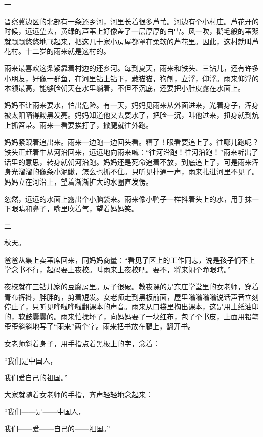 \documentclass[12pt,UTF-8,openany]{ctexbook}
\begin{document}
\begin{Large}
    
    一
    
    晋察冀边区的北部有一条还乡河，河里长着很多芦苇。河边有个小村庄。芦花开的时候，远远望去，黄绿的芦苇上好像盖了一层厚厚的白雪。风一吹，鹅毛般的苇絮就飘飘悠悠地飞起来，把这几十家小房屋都罩在柔软的芦花里。因此，这村就叫芦花村。十二岁的雨来就是这村的。
    
    雨来最喜欢这条紧靠着村边的还乡河。每到夏天，雨来和铁头、三钻儿，还有许多小朋友，好像一群鱼，在河里钻上钻下，藏猫猫，狗刨，立浮，仰浮。雨来仰浮的本领最高，能够脸朝天在水里躺着，不但不沉底，还要把小肚皮露在水面上。
    
    妈妈不让雨来耍水，怕出危险。有一天，妈妈见雨来从外面进来，光着身子，浑身被太阳晒得黝黑发亮。妈妈知道他又去耍水了，把脸一沉，叫他过来，扭身就到炕上抓笤帚。雨来一看要挨打了，撒腿就往外跑。
    
    妈妈紧跟着追出来。雨来一边跑一边回头看。糟了！眼看要追上了。往哪儿跑呢？铁头正赶着牛从河沿回来，远远地向雨来喊：“往河沿跑！往河沿跑！”雨来听出了话里的意思，转身就朝河沿跑。妈妈还是死命追着不放，到底追上了，可是雨来浑身光溜溜的像条小泥鳅，怎么也抓不住。只听见扑通一声，雨来扎进河里不见了。妈妈立在河沿上，望着渐渐扩大的水圈直发愣。
    
    忽然，远远的水面上露出个小脑袋来。雨来像小鸭子一样抖着头上的水，用手抹一下眼睛和鼻子，嘴里吹着气，望着妈妈笑。
    
    二
    
    秋天。
    
    爸爸从集上卖苇席回来，同妈妈商量：“看见了区上的工作同志，说是孩子们不上学念书不行，起码要上夜校。叫雨来上夜校吧。要不，将来闹个睁眼瞎。”
    
    夜校就在三钻儿家的豆腐房里。房子很破。教夜课的是东庄学堂里的女老师，穿着青布裤褂，胖胖的，剪着短发。女老师走到黑板前面，屋里嗡嗡嗡嗡说话声音立刻停止了，只听见哗啦哗啦翻课本的声音。雨来从口袋里掏出课本，这是用土纸油印的，软鼓囊囊的。雨来怕揉坏了，向妈妈要了一块红布，包了个书皮，上面用铅笔歪歪斜斜地写了“雨来”两个字。雨来把书放在腿上，翻开书。
    
    女老师斜着身子，用手指点着黑板上的字，念着：
    
    “我们是中国人，
    
    我们爱自己的祖国。”
    
    大家就随着女老师的手指，齐声轻轻地念起来：
    
    “我们——是——中国人，
    
    我们——爱——自己的——祖国。”
    

\end{Large}
\end{document}
